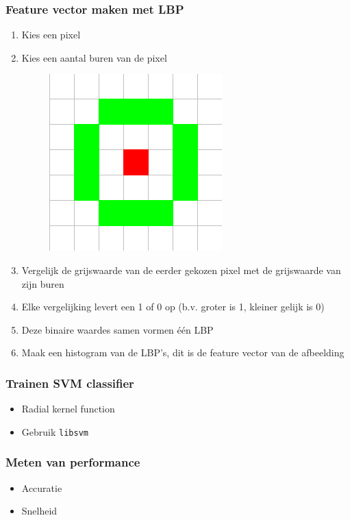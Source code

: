 \documentclass{beamer}
\begin{document}
    \begin{frame}
        \frametitle{Feature vector maken met LBP}

        \begin{enumerate}
            \item Kies een pixel
            \item Kies een aantal buren van de pixel
            \begin{figure}
                \includegraphics[scale=.4]{12-5neighbourhood.png}
            \end{figure}
            \item Vergelijk de grijswaarde van de eerder gekozen pixel met de
            grijswaarde van zijn buren
            \item Elke vergelijking levert een 1 of 0 op (b.v. groter is 1,
            kleiner gelijk is 0)
            \item Deze binaire waardes samen vormen \'e\'en LBP
            \item Maak een histogram van de LBP's, dit is de feature vector van
            de afbeelding
        \end{enumerate}
    \end{frame}

    \begin{frame}
        \frametitle{Trainen SVM classifier}

        \begin{itemize}
            \item Radial kernel function
            \item Gebruik \texttt{libsvm}
        \end{itemize}
    \end{frame}

    \begin{frame}
        \frametitle{Meten van performance}

        \begin{itemize}
            \item Accuratie
            \item Snelheid
        \end{itemize}
    \end{frame}
\end{document}
